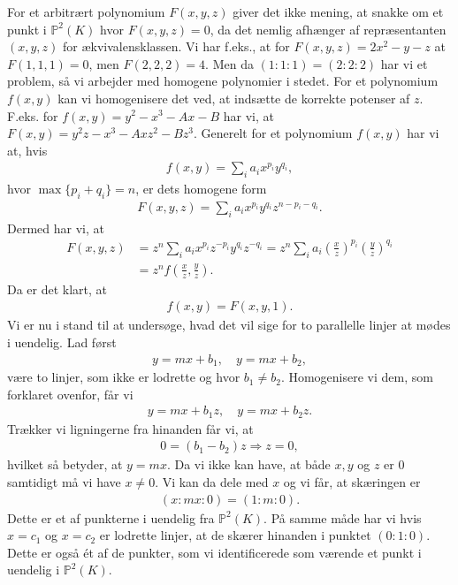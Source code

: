 For et arbitrært polynomium $F(x, y, z)$ giver det ikke mening, at snakke om et punkt i $\mathbb{P}^2(K)$ hvor $F(x, y, z) = 0$, da det nemlig afhænger af repræsentanten $(x, y, z)$ for ækvivalensklassen. Vi har f.eks., at for
$F(x, y, z) = 2x^2 - y - z$ at $F(1, 1, 1) = 0$, men $F(2, 2, 2) = 4$. Men da $(1 : 1 : 1) = (2 : 2 : 2)$ har vi et problem, så vi arbejder med homogene polynomier i stedet. For et polynomium $f(x, y)$ kan vi homogenisere det ved, at indsætte de korrekte potenser af $z$. F.eks. for $f(x, y) = y^2 - x^3 - Ax - B$ har vi, at $F(x, y) = y^2 z - x^3 - Axz^2 - Bz^3$. Generelt for et polynomium $f(x, y)$ har vi at, hvis
\begin{align*}
	f(x, y) = \sum_{i} a_i x^{p_i} y^{q_i},
\end{align*}
hvor $\max \{p_i + q_i \} = n$, er dets homogene form
\begin{align*}
	F(x, y, z) = \sum_i a_i x^{p_i} y^{q_i} z^{n-p_i - q_i}.
\end{align*}
Dermed har vi, at 
\begin{align*}
	F(x, y, z) &= z^n \sum_i a_i x^{p_i} z^{-p_i} y^{q_i} z^{-q_i} = z^n \sum_i a_i \left( \frac{x}{z} \right)^{p_i}
	\left( \frac{y}{z} \right)^{q_i} \\  
	&= z^n f\left( \frac{x}{z}, \frac{y}{z} \right).
\end{align*}
Da er det klart, at 
\begin{align*}
	f(x, y) = F(x, y, 1).
\end{align*}
Vi er nu i stand til at undersøge, hvad det vil sige for to parallelle linjer at mødes i uendelig. Lad først
\begin{align*}
	y = mx + b_1, \quad y = mx + b_2,
\end{align*}
være to linjer, som ikke er lodrette og hvor $b_1 \neq b_2$. Homogenisere vi dem, som forklaret ovenfor, får vi
\begin{align*}
	y = mx + b_1z, \quad y = mx + b_2 z.
\end{align*}
Trækker vi ligningerne fra hinanden får vi, at 
\begin{align*}
	0 = (b_1 - b_2)z \Rightarrow z = 0,
\end{align*}
hvilket så betyder, at $y = mx$. Da vi ikke kan have, at både $x, y$ og $z$ er $0$ samtidigt må vi have $x \neq 0$. Vi kan da dele med $x$ og vi får, at skæringen er
\begin{align*}
	(x : mx : 0) = (1 : m : 0).
\end{align*}
Dette er et af punkterne i uendelig fra $\mathbb{P}^2(K)$.
På samme måde har vi hvis $x=c_1$ og $x=c_2$ er lodrette linjer, at de skærer hinanden i punktet $(0 : 1 : 0)$. Dette er også ét af de punkter, som vi identificerede som værende et punkt i uendelig i $\mathbb{P}^2(K)$.

